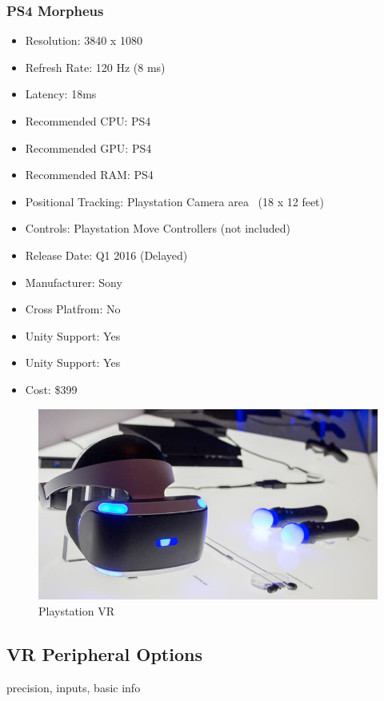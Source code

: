 \documentclass[a4paper,10pt]{article}
\begin{document}
\subsubsection{PS4 Morpheus}
\begin{itemize}
  \item Resolution: 3840 x 1080 
  \item Refresh Rate: 120 Hz (8 ms)
  \item Latency: 18ms
  \item Recommended CPU: PS4
  \item Recommended GPU: PS4
  \item Recommended RAM: PS4
  \item Positional Tracking: Playstation Camera area ~(18 x 12 feet)
  \item Controls: Playstation Move Controllers (not included)
  \item Release Date: Q1 2016 (Delayed)
  \item Manufacturer: Sony
  \item Cross Platfrom: No
    \item Unity Support: Yes
  \item Unity Support: Yes
  \item Cost: \$399
\end{itemize}
\begin{figure}[H]
	\includegraphics[width=\linewidth,height=\paperheight,keepaspectratio]{morpheus.jpg}
	\caption{Playstation VR}
	\label{fig:psvrImg}
\end{figure}
	\pagebreak
	
\pagebreak
\subsection{VR Peripheral Options}
precision, inputs, basic info
\end{document}
